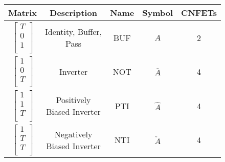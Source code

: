 \documentclass[12pt]{article}
\begin{document}
\begin{figure}[h]
    \centering
    \begin{tabular}{c|c|c|c|c}
        Matrix & Description & Name & Symbol & CNFETs \\
        \hline
        $\begin{bmatrix}T \\ 0 \\ 1 \\\end{bmatrix}$ & Identity, Buffer, Pass & BUF & $A$ & 2 \\
        $\begin{bmatrix}1 \\ 0 \\ T \\\end{bmatrix}$ & Inverter & NOT & $\overline{A}$ & 4 \\
        $\begin{bmatrix}1 \\ 1 \\ T \\\end{bmatrix}$ & Positively Biased Inverter & PTI & $\hat{A}$ & 4 \\
        $\begin{bmatrix}1 \\ T \\ T \\\end{bmatrix}$ & Negatively Biased Inverter & NTI & $\check{A}$ & 4 \\

\end{tabular}
\end{figure}
\end{document}
